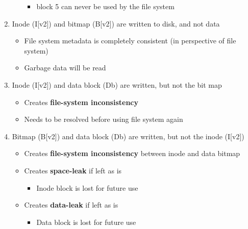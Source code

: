 \documentclass[12pt]{article}
\begin{document}
\begin{enumerate}[1)]
\begin{itemize}
        \begin{itemize}
            \item block 5 can never be used by the file system
        \end{itemize}
    \end{itemize}

    \bigskip

    \item Inode (I[v2]) and bitmap (B[v2]) are written to disk, and not data

    \bigskip

    \begin{itemize}
        \item File system metadata is completely consistent (in perspective of file system)
        \item Garbage data will be read
    \end{itemize}

    \bigskip

    \item Inode (I[v2]) and data block (Db) are written, but not the bit map

    \bigskip

    \begin{itemize}
        \item Creates \textbf{file-system inconsistency}
        \item Needs to be resolved before using file system again
    \end{itemize}

    \bigskip

    \item Bitmap (B[v2]) and data block (Db) are written, but not the inode (I[v2])

    \bigskip

    \begin{itemize}
        \item Creates \textbf{file-system inconsistency} between inode and data bitmap
        \item Creates \textbf{space-leak} if left as is
        \begin{itemize}
            \item Inode block is lost for future use
        \end{itemize}
        \item Creates \textbf{data-leak} if left as is

        \begin{itemize}
            \item Data block is lost for future use
        \end{itemize}
    \end{itemize}
\end{enumerate}
\end{document}
